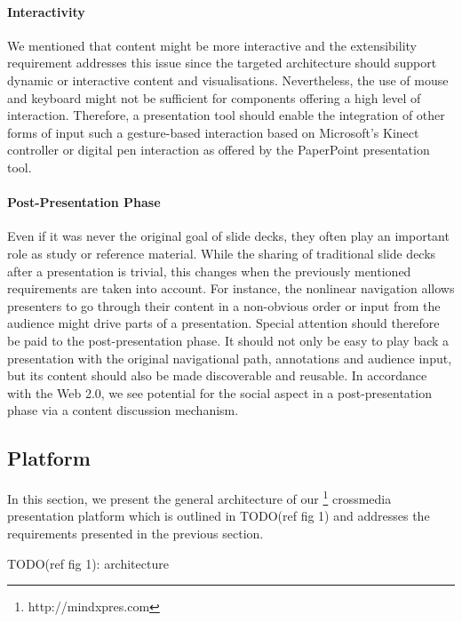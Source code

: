 \documentclass[a4paper,12pt]{report}
\begin{document}
     \paragraph{Interactivity} We mentioned that content might be more
      interactive and the extensibility requirement addresses this issue since
      the targeted architecture should support dynamic or interactive content
      and visualisations. Nevertheless, the use of mouse and keyboard might not
      be sufficient for components offering a high level of interaction.
      Therefore, a presentation tool should enable the integration of other
      forms of input such a gesture-based interaction based on Microsoft's
      Kinect controller or digital pen interaction \citep{signer-2} as offered
      by the PaperPoint \citep{signer-1} presentation tool.

     \paragraph{Post-Presentation Phase} Even if it was never the original goal
      of slide decks, they often play an important role as study or reference
      material. While the sharing of traditional slide decks after a
      presentation is trivial, this changes when the previously mentioned
      requirements are taken into account. For instance, the nonlinear
      navigation allows presenters to go through their content in a non-obvious
      order or input from the audience might drive parts of a presentation.
      Special attention should therefore be paid to the post-presentation
      phase. It should not only be easy to play back a presentation with the
      original navigational path, annotations and audience input, but its
      content should also be made discoverable and reusable. In accordance with
      the Web 2.0, we see potential for the social aspect in a
      post-presentation phase via a content discussion mechanism.

   \subsection{\mxp Platform}

    In this section, we present the general architecture of our
    \mxp\footnote{http://mindxpres.com} crossmedia presentation platform which
    is outlined in TODO(ref fig 1) and addresses the requirements presented in
    the previous section.

    TODO(ref fig 1): \mxp architecture
\end{document}

